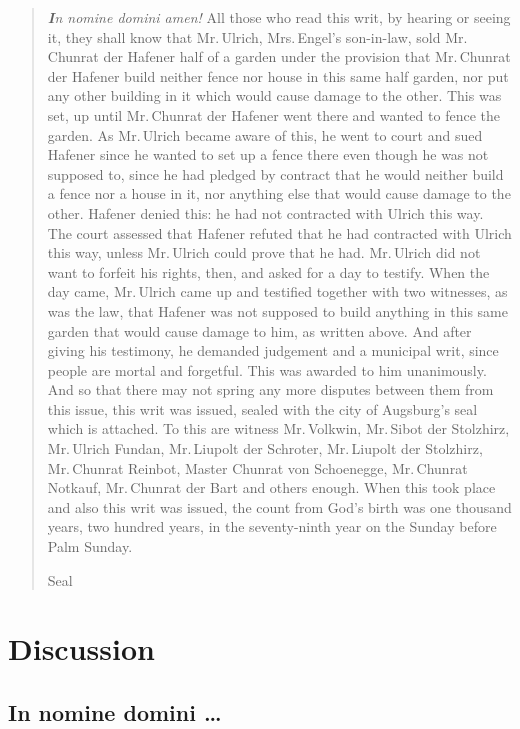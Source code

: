 \documentclass[12pt,paper=a4]{scrartcl}
\begin{document}
\blockquote{\emph{\textbf{I}n nomine domini amen!} All those who read this writ, 
by hearing or seeing it, they shall know that Mr.\,Ulrich, Mrs.\,Engel's 
son-in-law, sold Mr.\,Chunrat der Hafener half of a garden under the provision 
that Mr.\,Chunrat der Hafener build neither fence nor house in this same half 
garden, nor put any other building in it which would cause damage to the other. 
This was set, up until Mr.\,Chunrat der Hafener went there and wanted to fence the 
garden. As Mr.\,Ulrich became aware of this, he went to court and sued Hafener 
since he wanted to set up a fence there even though he was not supposed to, 
since he had pledged by contract that he would neither build a fence nor a house 
in it, nor anything else that would cause damage to the other. Hafener denied 
this: he had not contracted with Ulrich this way. The court assessed that 
Hafener refuted that he had contracted with Ulrich this way, unless Mr.\,Ulrich 
could prove that he had. Mr.\,Ulrich did not want to forfeit his rights, then, 
and asked for a day to testify. When the day came, Mr.\,Ulrich came up and 
testified together with two witnesses, as was the law, that Hafener was not 
supposed to build anything in this same garden that would cause damage to him, 
as written above. And after giving his testimony, he demanded judgement and a 
municipal writ, since people are mortal and forgetful. This was awarded to him 
unanimously. And so that there may not spring any more disputes between them 
from this issue, this writ was issued, sealed with the city of Augsburg's seal 
which is attached. To this are witness Mr.\,Volkwin, Mr.\,Sibot der Stolzhirz, 
Mr.\,Ulrich Fundan, Mr.\,Liupolt der Schroter, Mr.\,Liupolt der Stolzhirz, 
Mr.\,Chunrat Reinbot, Master Chunrat von Schoenegge, Mr.\,Chunrat Notkauf, 
Mr.\,Chunrat der Bart and others enough. When this took place and also this 
writ was issued, the count from God's birth was one thousand years, two hundred 
years, in the seventy-ninth year on the Sunday before Palm Sunday.

\begin{center}
Seal
\end{center}}

\section{Discussion}

\subsection*{In nomine domini …}
\end{document}

